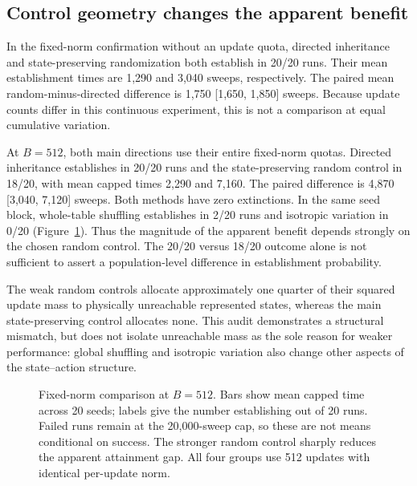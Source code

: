 \documentclass[11pt]{article}
\begin{document}
\subsection{Control geometry changes the apparent benefit}
In the fixed-norm confirmation without an update quota, directed inheritance and state-preserving randomization both establish in 20/20 runs. Their mean establishment times are 1,290 and 3,040 sweeps, respectively. The paired mean random-minus-directed difference is 1,750 [1,650, 1,850] sweeps. Because update counts differ in this continuous experiment, this is not a comparison at equal cumulative variation.

At $B=512$, both main directions use their entire fixed-norm quotas. Directed inheritance establishes in 20/20 runs and the state-preserving random control in 18/20, with mean capped times 2,290 and 7,160. The paired difference is 4,870 [3,040, 7,120] sweeps. Both methods have zero extinctions. In the same seed block, whole-table shuffling establishes in 2/20 runs and isotropic variation in 0/20 (Figure~\ref{fig:control}). Thus the magnitude of the apparent benefit depends strongly on the chosen random control. The 20/20 versus 18/20 outcome alone is not sufficient to assert a population-level difference in establishment probability.

The weak random controls allocate approximately one quarter of their squared update mass to physically unreachable represented states, whereas the main state-preserving control allocates none. This audit demonstrates a structural mismatch, but does not isolate unreachable mass as the sole reason for weaker performance: global shuffling and isotropic variation also change other aspects of the state--action structure.

\begin{figure}[htbp]\centering
{}
\caption{Fixed-norm comparison at $B=512$. Bars show mean capped time across 20 seeds; labels give the number establishing out of 20 runs. Failed runs remain at the 20,000-sweep cap, so these are not means conditional on success. The stronger random control sharply reduces the apparent attainment gap. All four groups use 512 updates with identical per-update norm.}\label{fig:control}
\end{figure}
\end{document}
